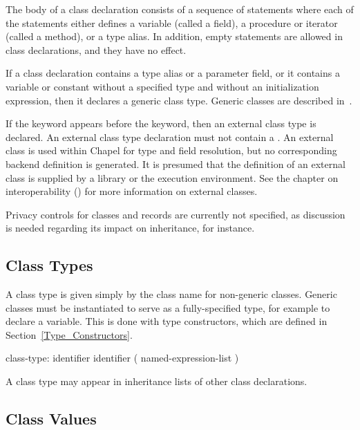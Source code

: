 The body of a class declaration consists of a sequence of statements
where each of the statements either defines a variable (called a
field), a procedure or iterator (called a method), or a type alias.  In addition, empty
statements are allowed in class declarations, and they have no effect.

If a class declaration contains a type alias or a parameter field, or it contains a variable or
constant without a specified type and without an initialization
expression, then it declares a generic class type.  Generic classes are described
in~.

If the  keyword appears before the  keyword, then an
external class type is declared.  An external class type declaration must not
contain a .  An external class is used within Chapel
for type and field resolution, but no corresponding backend definition is
generated.  It is presumed that the definition of an external class is supplied
by a library or the execution environment.  See the chapter on interoperability
() for more information on external classes.

\begin{future}
Privacy controls for classes and records are currently not specified,
as discussion is needed regarding its impact on inheritance, for
instance.
\end{future}

\subsection{Class Types}
\label{Class_Types}

A class type is given simply by the class name for non-generic classes.
Generic classes must be instantiated to serve as a fully-specified
type, for example to declare a variable.  This is done with
type constructors, which are defined in Section~\ref{Type_Constructors}.

\begin{syntax}
class-type:
  identifier
  identifier ( named-expression-list )
\end{syntax}

A class type may appear in inheritance lists of
other class declarations.

\subsection{Class Values}
\label{Class_Values}

